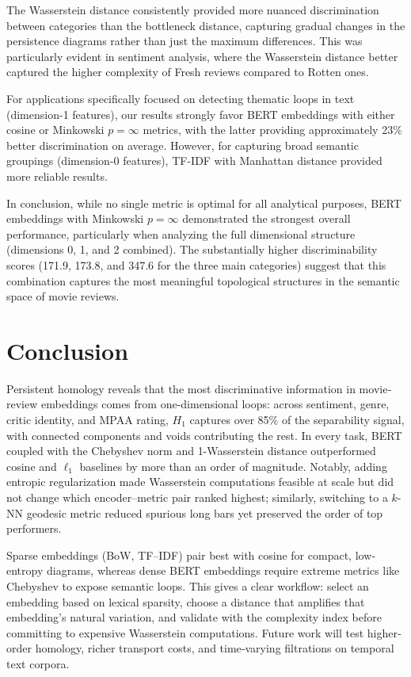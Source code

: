 \documentclass[fleqn,10pt]{SelfArx}
\begin{document}
The Wasserstein distance consistently provided more nuanced discrimination between categories than the bottleneck distance, capturing gradual changes in the persistence diagrams rather than just the maximum differences. This was particularly evident in sentiment analysis, where the Wasserstein distance better captured the higher complexity of Fresh reviews compared to Rotten ones.

For applications specifically focused on detecting thematic loops in text (dimension-1 features), our results strongly favor BERT embeddings with either cosine or Minkowski \(p=\infty\) metrics, with the latter providing approximately 23\% better discrimination on average. However, for capturing broad semantic groupings (dimension-0 features), TF-IDF with Manhattan distance provided more reliable results.

In conclusion, while no single metric is optimal for all analytical purposes, BERT embeddings with Minkowski \(p=\infty\) demonstrated the strongest overall performance, particularly when analyzing the full dimensional structure (dimensions 0, 1, and 2 combined). The substantially higher discriminability scores (171.9, 173.8, and 347.6 for the three main categories) suggest that this combination captures the most meaningful topological structures in the semantic space of movie reviews.

\section{Conclusion}
Persistent homology reveals that the most discriminative information in movie‐review embeddings comes from one-dimensional loops: across sentiment, genre, critic identity, and MPAA rating, $H_1$ captures over 85\% of the separability signal, with connected components and voids contributing the rest.  In every task, BERT coupled with the Chebyshev norm and 1-Wasserstein distance outperformed cosine and $\ell_1$ baselines by more than an order of magnitude.  Notably, adding entropic regularization made Wasserstein computations feasible at scale but did not change which encoder–metric pair ranked highest; similarly, switching to a $k$-NN geodesic metric reduced spurious long bars yet preserved the order of top performers.

Sparse embeddings (BoW, TF–IDF) pair best with cosine for compact, low‐entropy diagrams, whereas dense BERT embeddings require extreme metrics like Chebyshev to expose semantic loops.  This gives a clear workflow: select an embedding based on lexical sparsity, choose a distance that amplifies that embedding’s natural variation, and validate with the complexity index before committing to expensive Wasserstein computations.  Future work will test higher‐order homology, richer transport costs, and time‐varying filtrations on temporal text corpora.
\end{document}
